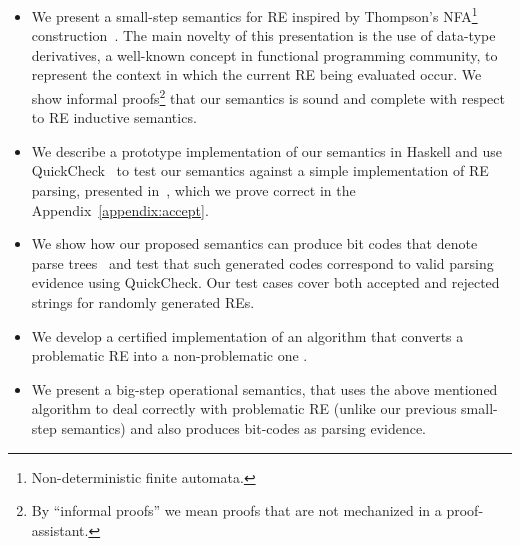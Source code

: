 \documentclass[oneside,12pt]{scrbook}
\theoremstyle{definition}
\theoremstyle{plain}
\theoremstyle{definition}
\begin{document}
\begin{itemize}
	\item We present a small-step semantics for RE inspired by  Thompson's NFA\footnote{Non-deterministic finite automata.}
	construction~\cite{Thompson1968}. The main novelty of this presentation is
	the use of data-type derivatives, a well-known concept in functional programming community, to represent
	the context in which the current RE being evaluated occur. We show informal proofs\footnote{By ``informal proofs'' we
		mean proofs that are not mechanized in a proof-assistant.} that our semantics is sound and complete with respect to RE inductive semantics.
	 \item We describe a prototype implementation of our semantics in Haskell and use QuickCheck~\cite{Claessen2000} to test our semantics
	 against a simple implementation of RE parsing, presented in~\cite{Fischer2010}, which we prove correct in the Appendix~\ref{appendix:accept}. 
	 \item We show how our proposed semantics can produce bit codes that denote parse trees~\cite{Lasse2011} and test that
	 such generated codes correspond to valid parsing evidence using QuickCheck.
	 Our test cases cover both accepted and rejected strings for randomly generated REs. %
	 	\item We develop a certified implementation of an algorithm that converts a problematic RE into a non-problematic one \cite{Medeiros14}.
	 \item We present a big-step operational semantics, that uses the above mentioned algorithm to deal correctly with problematic RE (unlike our previous small-step semantics) and also produces bit-codes as parsing evidence.


\end{itemize}
\end{document}
